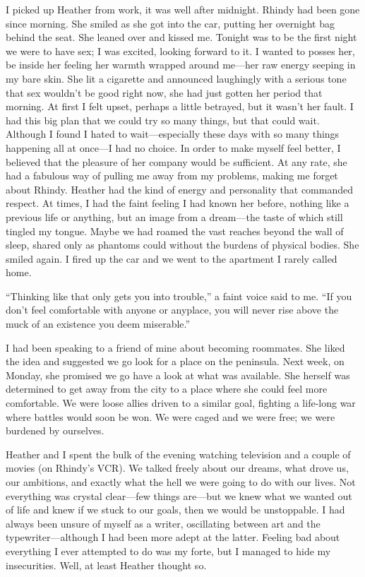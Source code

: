 I picked up Heather from work, it was well after midnight. Rhindy had
been gone since morning. She smiled as she got into the car, putting her
overnight bag behind the seat. She leaned over and kissed me. Tonight
was to be the first night we were to have sex; I was excited, looking
forward to it. I wanted to posses her, be inside her feeling her warmth
wrapped around me---her raw energy seeping in my bare skin. She lit a
cigarette and announced laughingly with a serious tone that sex wouldn't
be good right now, she had just gotten her period that morning. At first
I felt upset, perhaps a little betrayed, but it wasn't her fault. I had
this big plan that we could try so many things, but that could wait.
Although I found I hated to wait---especially these days with so many
things happening all at once---I had no choice. In order to make myself
feel better, I believed that the pleasure of her company would be
sufficient. At any rate, she had a fabulous way of pulling me away from
my problems, making me forget about Rhindy. Heather had the kind of
energy and personality that commanded respect. At times, I had the faint
feeling I had known her before, nothing like a previous life or
anything, but an image from a dream---the taste of which still tingled
my tongue. Maybe we had roamed the vast reaches beyond the wall of
sleep, shared only as phantoms could without the burdens of physical
bodies. She smiled again. I fired up the car and we went to the
apartment I rarely called home.

``Thinking like that only gets you into trouble,'' a faint voice said to
me. ``If you don't feel comfortable with anyone or anyplace, you will
never rise above the muck of an existence you deem miserable.''

I had been speaking to a friend of mine about becoming roommates. She
liked the idea and suggested we go look for a place on the peninsula.
Next week, on Monday, she promised we go have a look at what was
available. She herself was determined to get away from the city to a
place where she could feel more comfortable. We were loose allies driven
to a similar goal, fighting a life-long war where battles would soon be
won. We were caged and we were free; we were burdened by ourselves.

Heather and I spent the bulk of the evening watching television and a
couple of movies (on Rhindy's VCR). We talked freely about our dreams,
what drove us, our ambitions, and exactly what the hell we were going to
do with our lives. Not everything was crystal clear---few things
are---but we knew what we wanted out of life and knew if we stuck to our
goals, then we would be unstoppable. I had always been unsure of myself
as a writer, oscillating between art and the typewriter---although I had
been more adept at the latter. Feeling bad about everything I ever
attempted to do was my forte, but I managed to hide my insecurities.
Well, at least Heather thought so.

